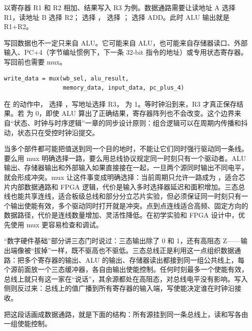 以寄存器 R1 和 R2 相加、结果写入 R3 为例。数据通路需要让读地址 A 选择 R1，读地址 B 选择 R2； 选择 ， 选择 ； 选择 ADD。此时 ALU 输出就是 R1+R2。

写回数据也不一定只来自 ALU。它可能来自 ALU，也可能来自存储器读口、外部输入、PC+4（字节编址惯例下，下一条 32-bit 指令的地址）或专用状态寄存器。写回前也需要 mux。

\begin{lstlisting}
write_data = mux(wb_sel, alu_result,
                 memory_data, input_data, pc_plus_4)
\end{lstlisting}

在  的动作中， 选择 ，写地址选择 R3， 为 1。等时钟沿到来，R3 才真正保存结果。若  为 0，即使 ALU 算出了正确结果，寄存器阵列也不会改变。这个边界来自“状态、时钟与时序逻辑”一章的同步设计原则：组合逻辑可以在周期内传播和抖动，状态只在受控时钟沿提交。

当多个部件都可能把值送到同一个目的地时，不能让它们同时强行驱动同一条线。要么用 mux 明确选择一路，要么用总线协议规定同一时刻只有一个驱动者。ALU 输出、存储器输出和外部输入如果直接接在一起，一旦两个源同时输出不同电平，就会形成冲突。mux 让这件事变成明确选择：当前周期只允许一路成为 ，适合芯片内部数据通路和 FPGA 逻辑，代价是输入多时选择器延迟和面积增加。三态总线也能共享连线，适合板级总线和部分分立芯片实验，但必须保证同一时刻只有一个输出使能有效，多个驱动同时打开就是冲突。点到点连线适合高频、固定方向的数据路径，代价是连线数量增加、灵活性降低。在初学实验和 FPGA 设计中，优先使用 mux 更容易检查和调试。


“数字硬件基础”部分讲三态门时说过：三态输出除了 0 和 1，还有高阻态 Z——输出端像被“拔掉”一样，既不驱高也不驱低。三态总线正是利用这一点组织数据通路：把多个寄存器的输出、ALU 的输出、存储器读出都接到同一组公共线上，每个源前面放一个三态缓冲器，各自由输出使能控制。任何时刻最多一个使能有效，总线上就只有这一家在“说话”，其余源都处在高阻态，对总线电平没有影响。写入侧则反过来：总线上的值广播到所有寄存器的输入端，写使能决定谁在时钟沿接收。

把这段话画成数据通路，就是下面的结构：所有源挂到同一条总线上，读和写各由一组使能控制。


